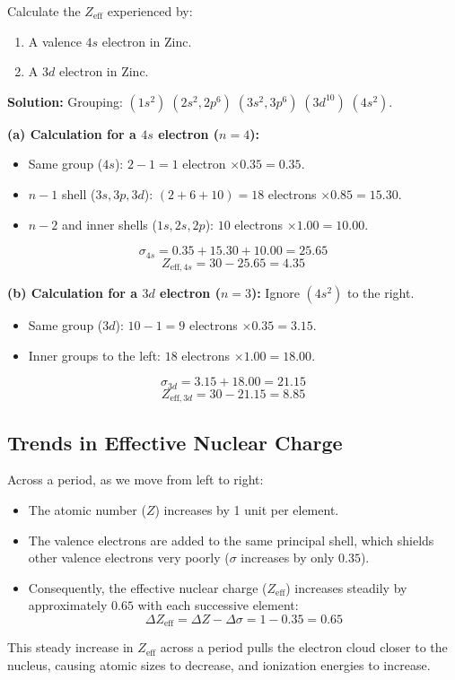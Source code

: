 \documentclass[12pt,a4paper]{article}
\begin{document}
\begin{tcolorbox}[examplebox, title={Example 1.3: Calculation for Zinc ($Zn$, $Z=30$)}]
  Calculate the $Z_{\text{eff}}$ experienced by:
  \begin{enumerate}[label=(\alph*), itemsep=1pt, topsep=2pt]
    \item A valence $4s$ electron in Zinc.
    \item A $3d$ electron in Zinc.
  \end{enumerate}
  \par\vspace{4pt}
  \textbf{Solution:}
  Grouping: $(1s^2) \; (2s^2, 2p^6) \; (3s^2, 3p^6) \; (3d^{10}) \; (4s^2)$.
  \par\vspace{4pt}
  \textbf{(a) Calculation for a $4s$ electron ($n=4$):}
  \begin{itemize}[leftmargin=*, itemsep=1pt]
    \item Same group ($4s$): $2 - 1 = 1$ electron $\times 0.35 = 0.35$.
    \item $n-1$ shell ($3s, 3p, 3d$): $(2 + 6 + 10) = 18$ electrons $\times 0.85 = 15.30$.
    \item $n-2$ and inner shells ($1s, 2s, 2p$): $10$ electrons $\times 1.00 = 10.00$.
  \end{itemize}
  \[ \sigma_{4s} = 0.35 + 15.30 + 10.00 = 25.65 \]
  \[ Z_{\text{eff}, 4s} = 30 - 25.65 = 4.35 \]
  \par\vspace{4pt}
  \textbf{(b) Calculation for a $3d$ electron ($n=3$):}
  Ignore $(4s^2)$ to the right.
  \begin{itemize}[leftmargin=*, itemsep=1pt]
    \item Same group ($3d$): $10 - 1 = 9$ electrons $\times 0.35 = 3.15$.
    \item Inner groups to the left: $18$ electrons $\times 1.00 = 18.00$.
  \end{itemize}
  \[ \sigma_{3d} = 3.15 + 18.00 = 21.15 \]
  \[ Z_{\text{eff}, 3d} = 30 - 21.15 = 8.85 \]
\end{tcolorbox}

\subsection{Trends in Effective Nuclear Charge}
Across a period, as we move from left to right:
\begin{itemize}[leftmargin=*, itemsep=2pt]
  \item The atomic number ($Z$) increases by 1 unit per element.
  \item The valence electrons are added to the same principal shell, which shields other valence electrons very poorly ($\sigma$ increases by only $0.35$).
  \item Consequently, the effective nuclear charge ($Z_{\text{eff}}$) increases steadily by approximately $0.65$ with each successive element:
  \[ \Delta Z_{\text{eff}} = \Delta Z - \Delta\sigma = 1 - 0.35 = 0.65 \]
\end{itemize}
This steady increase in $Z_{\text{eff}}$ across a period pulls the electron cloud closer to the nucleus, causing atomic sizes to decrease, and ionization energies to increase.
\end{document}

